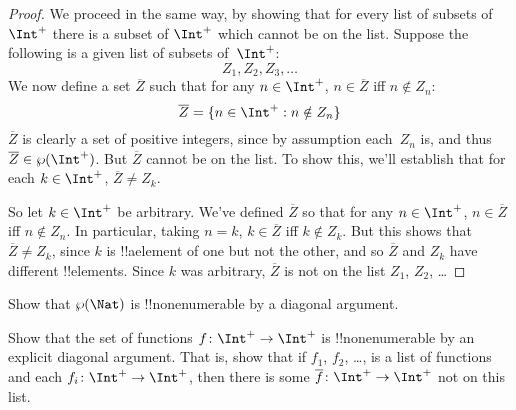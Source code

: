 \documentclass[../../../include/open-logic-section]{subfiles}
\begin{document}
\begin{proof}
We proceed in the same way, by showing that for every list of subsets
of~$\Int^+$ there is a subset of $\Int^+$ which cannot be on the list.
Suppose the following is a given list of subsets of~$\Int^+$:
\[
Z_{1}, Z_{2}, Z_{3}, \dots
\]
We now define a set $\overline{Z}$ such that for any $n \in \Int^+$,
$n \in \overline{Z}$ iff $n \notin Z_{n}$:
\[
\overline{Z} = \Setabs{n \in \Int^+}{n \notin Z_n}
\]
$\overline{Z}$ is clearly a set of positive integers, since by
assumption each~$Z_n$ is, and thus $\overline{Z} \in
\Pow{\Int^+}$. But $\overline{Z}$ cannot be on the list.  To show
this, we'll establish that for each $k \in \Int^+$, $\overline{Z} \neq
Z_k$. 

So let $k \in \Int^+$ be arbitrary. We've defined $\overline{Z}$ so
that for any $n \in \Int^+$, $n \in \overline{Z}$ iff $n \notin Z_n$.
In particular, taking $n=k$, $k \in \overline{Z}$ iff $k \notin Z_k$.
But this shows that $\overline{Z} \neq Z_k$, since $k$ is !!a{element}
of one but not the other, and so $\overline{Z}$ and $Z_k$ have
different !!{element}s. Since $k$ was arbitrary, $\overline{Z}$ is not
on the list $Z_1$, $Z_2$, \dots
\end{proof}

\begin{prob}
Show that $\Pow{\Nat}$ is !!{nonenumerable} by a diagonal argument.
\end{prob}

\begin{prob}
Show that the set of functions $f \colon \Int^+ \to \Int^+$ is
!!{nonenumerable} by an explicit diagonal argument. That is, show that
if $f_1$, $f_2$, \dots, is a list of functions and each $f_i\colon
\Int^+ \to \Int^+$, then there is some $\overline{f}\colon \Int^+ \to
\Int^+$ not on this list.
\end{prob}
\end{document}

